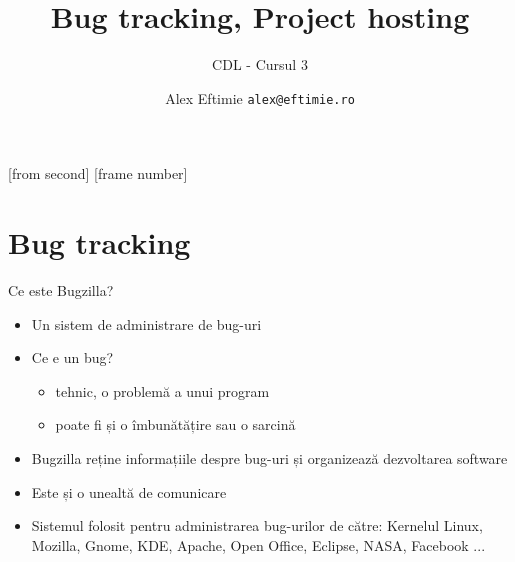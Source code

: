 \documentclass{beamer}
\title[BugzillaLaunchpad]{Bug tracking, Project hosting} %
\subtitle{CDL - Cursul 3}
\institute{ROSEdu}
\author{Alex Eftimie \texttt{alex@eftimie.ro}}
\begin{document}
[from second]
[frame number]

\frame{\titlepage}

\frame{\tableofcontents}

\section{Bug tracking}

\frame{\tableofcontents[currentsection]}

\begin{frame}{Ce este Bugzilla?}
\begin{itemize} %
\item Un sistem de administrare de bug-uri
\pause \item Ce e un bug?
\begin{itemize}
\pause \item tehnic, o problemă a unui program
\pause \item poate fi și o îmbunătățire sau o sarcină
\end{itemize}
\pause \item Bugzilla reține informațiile despre bug-uri și organizează dezvoltarea software
\item Este și o unealtă de comunicare
\item Sistemul folosit pentru administrarea bug-urilor de către: Kernelul Linux, Mozilla, Gnome, KDE, Apache, Open Office, Eclipse, NASA, Facebook ...
\end{itemize}
\end{frame}
\end{document}
